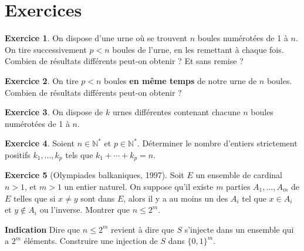 \documentclass[11pt]{article}
\newcommand{\N}{\mathbb N}
\theoremstyle{definition}
\newtheorem{exo}{Exercice}
\theoremstyle{remark}
\theoremstyle{theorem}
\begin{document}
\section{Exercices}

\begin{exo}
	On dispose d'une urne où se trouvent $n$ boules numérotées de 1 à $n$. On tire successivement $p<n$ boules de l'urne, en les remettant à chaque fois. Combien de résultats différents peut-on obtenir ? Et sans remise ?
\end{exo}

\begin{exo}
	On tire $p<n$ boules \textbf{en même temps} de notre urne de $n$ boules. Combien de résultats différents peut-on obtenir ?
\end{exo}

\begin{exo}
	On dispose de $k$ urnes différentes contenant chacune $n$ boules numérotées de 1 à $n$.
\end{exo}

\begin{exo}
	Soient $n\in\N^*$ et $p\in\N^*$. Déterminer le nombre d'entiers strictement positifs $k_1,\ldots,k_p$ tels que $k_1+\cdots+k_p = n$.
\end{exo}

\begin{exo}[Olympiades balkaniques, 1997]
	Soit $E$ un ensemble de cardinal $n>1$, et $m>1$ un entier naturel. On suppose qu'il existe $m$ parties $A_1,\ldots,A_m$ de $E$ telles que si $x\neq y$ sont dans $E$, alors il y a au moins un des $A_i$ tel que $x\in A_i$ et $y\not\in A_i$ ou l'inverse. Montrer que $n\leq 2^m$.
	
	\textbf{Indication} Dire que $n\leq 2^m$ revient à dire que $S$ s'injecte dans un ensemble qui a $2^m$ éléments. Construire une injection de $S$ dans $\{0,1\}^m$.
\end{exo}
\end{document}
